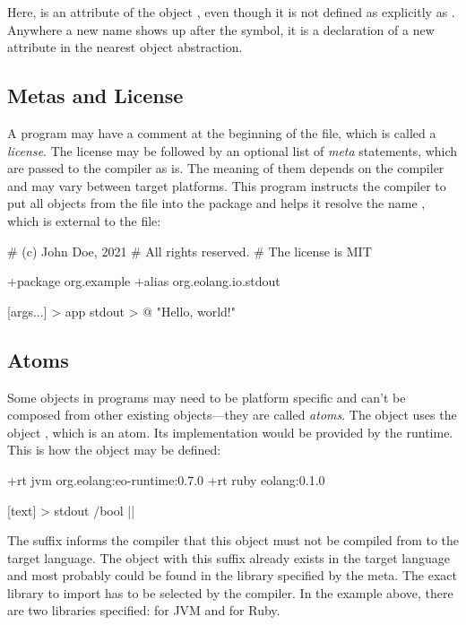 Here,  is an attribute of the object , even though
it is not defined as explicitly as . Anywhere a new
name shows up after the \ff{>} symbol, it is a declaration of a new
attribute in the nearest object abstraction.

\subsection{Metas and License}

A program may have a comment at the beginning of the file, which
is called a \emph{license}. The license may be followed by an optional
list of \emph{meta} statements, which are passed to the compiler
as is. The meaning of them depends on the compiler and may vary
between target platforms. This program instructs the compiler
to put all objects from the file into the package 
and helps it resolve the name , which is external
to the file:

\begin{ffcode}
# (c) John Doe, 2021
# All rights reserved.
# The license is MIT

+package org.example
+alias org.eolang.io.stdout

[args...] > app
  stdout > @
    "Hello, world!\n"
\end{ffcode}

\subsection{Atoms}

Some objects in \eo{} programs may need to be platform specific
and can't be composed from other existing objects---they are called
\emph{atoms}.
The object  uses the object ,
which is an atom. Its implementation would be provided by the
runtime. This is how the object may be defined:

\begin{ffcode}
+rt jvm org.eolang:eo-runtime:0.7.0
+rt ruby eolang:0.1.0

[text] > stdout /bool |$\label{ln:stdout}$|
\end{ffcode}

The  suffix informs the compiler that this object must
not be compiled from \eo{} to the target language. The object
with this suffix already exists in the target language and most
probably could be found in the library specified by the 
meta. The exact library to import has to be selected by the compiler.
In the example above, there are two libraries specified: for JVM and
for Ruby.

